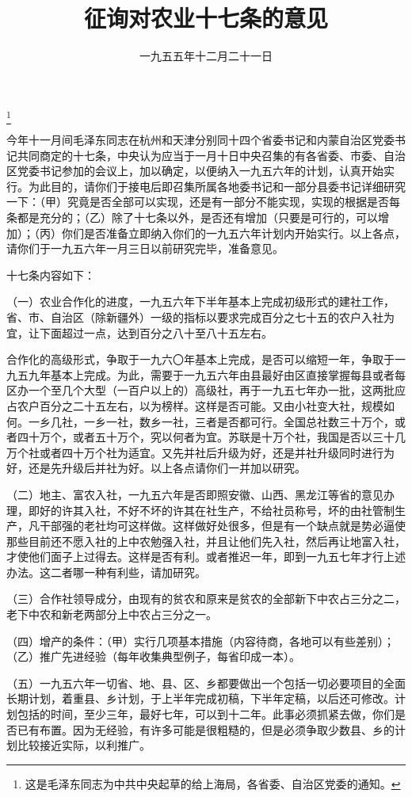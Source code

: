 
\title{征询对农业十七条的意见}
\date{一九五五年十二月二十一日}
\thanks{这是毛泽东同志为中共中央起草的给上海局，各省委、自治区党委的通知。}
\maketitle


今年十一月间毛泽东同志在杭州和天津分别同十四个省委书记和内蒙自治区党委书记共同商定的十七条，中央认为应当于一月十日中央召集的有各省委、市委、自治区党委书记参加的会议上，加以确定，以便纳入一九五六年的计划，认真开始实行。为此目的，请你们于接电后即召集所属各地委书记和一部分县委书记详细研究一下：（甲）究竟是否全部可以实现，还是有一部分不能实现，实现的根据是否每条都是充分的；（乙）除了十七条以外，是否还有增加（只要是可行的，可以增加）；（丙）你们是否准备立即纳入你们的一九五六年计划内开始实行。以上各点，请你们于一九五六年一月三日以前研究完毕，准备意见。

十七条内容如下：

（一）农业合作化的进度，一九五六年下半年基本上完成初级形式的建社工作，省、市、自治区（除新疆外）一级的指标以要求完成百分之七十五的农户入社为宜，让下面超过一点，达到百分之八十至八十五左右。

合作化的高级形式，争取于一九六〇年基本上完成，是否可以缩短一年，争取于一九五九年基本上完成。为此，需要于一九五六年由县最好由区直接掌握每县或者每区办一个至几个大型（一百户以上的）高级社，再于一九五七年办一批，这两批应占农户百分之二十五左右，以为榜样。这样是否可能。又由小社变大社，规模如何。一乡几社，一乡一社，数乡一社，三者是否都可行。全国总社数三十万个，或者四十万个，或者五十万个，究以何者为宜。苏联是十万个社，我国是否以三十几万个社或者四十万个社为适宜。又先并社后升级为好，还是并社升级同时进行为好，还是先升级后并社为好。以上各点请你们一并加以研究。

（二）地主、富农入社，一九五六年是否即照安徽、山西、黑龙江等省的意见办理，即好的许其入社，不好不坏的许其在社生产，不给社员称号，坏的由社管制生产，凡干部强的老社均可这样做。这样做好处很多，但是有一个缺点就是势必逼使那些目前还不愿入社的上中农勉强入社，并且让他们先入社，然后再让地富入社，才使他们面子上过得去。这样是否有利。或者推迟一年，即到一九五七年才行上述办法。这二者哪一种有利些，请加研究。

（三）合作社领导成分，由现有的贫农和原来是贫农的全部新下中农占三分之二，老下中农和新老两部分上中农占三分之一。

（四）增产的条件：（甲）实行几项基本措施（内容待商，各地可以有些差别）；（乙）推广先进经验（每年收集典型例子，每省印成一本）。

（五）一九五六年一切省、地、县、区、乡都要做出一个包括一切必要项目的全面长期计划，着重县、乡计划，于上半年完成初稿，下半年定稿，以后还可修改。计划包括的时间，至少三年，最好七年，可以到十二年。此事必须抓紧去做，你们是否已有布置。因为无经验，有许多可能是很粗糙的，但是必须争取少数县、乡的计划比较接近实际，以利推广。

